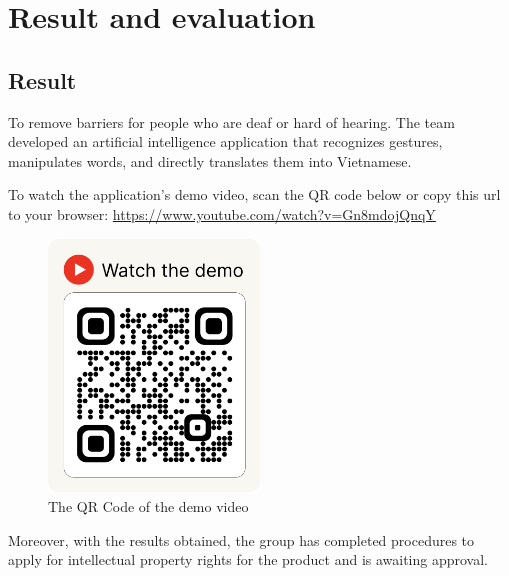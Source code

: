 \chapter{Result and evaluation}

\section{Result}

To remove barriers for people who are deaf or hard of hearing. The team developed an artificial intelligence application that recognizes gestures, manipulates words, and directly translates them into Vietnamese.


To watch the application's demo video, scan the QR code below or copy this url to your browser: \url{https://www.youtube.com/watch?v=Gn8mdojQnqY}

\begin{figure}[H]
	\centering
	\includegraphics[width=0.5\textwidth]{img/qrcode_to_demo.png}
	\caption{The QR Code of the demo video}
  \label{fig:qrcode_to_demo}
\end{figure}


Moreover, with the results obtained, the group has completed procedures to apply for intellectual property rights for the product and is awaiting approval.


